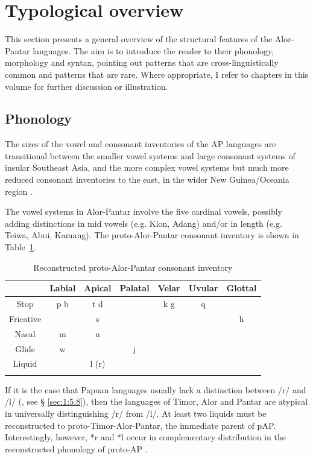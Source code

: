 \section{Typological overview}\label{sec:1:5}

This section presents a general overview of the structural features of the Alor-Pantar languages. The aim is to introduce the reader to their phonology, morphology and syntax, pointing out patterns that are cross-linguistically common and patterns that are rare. Where appropriate, I refer to chapters in this volume for further discussion or illustration. 

\subsection{Phonology}\label{sec:1:5.1}
The sizes of the vowel and consonant inventories of the AP languages are transitional between the smaller vowel systems and large consonant systems of insular Southeast Asia, and the more complex vowel systems but much more reduced consonant inventories to the east, in the wider New Guinea/Oceania region \citep[cf.][]{Hajek2010}.

The vowel systems in Alor-Pantar involve the five cardinal vowels, possibly adding distinctions in mid vowels (e.g. Klon, Adang) and/or in length (e.g. Teiwa, Abui, Kamang). The proto-Alor-Pantar consonant inventory \citep{HoltonEtAl2012,HoltonRobinsonTVhistory} is shown in Table~\ref{tab:1:3}.



\begin{table} 
\begin{tabularx}{\textwidth}{ccccccc} 
\lsptoprule
& {Labial} & {Apical} & {Palatal} & {Velar} & {Uvular} & {Glottal}\\
\midrule 
{Stop} & {p  b} & {t  d} &  & {k  g} & {q} & \\
{Fricative} &  & {s} &  &  &  & {h}\\
{Nasal} & {m} & {n} &  &  &  & \\
{Glide} & {w} &  & {j} &  &  & \\
{Liquid} &  & {l (r)} &  &  &  & \\
\lspbottomrule
\end{tabularx}
\caption{Reconstructed proto-Alor-Pantar consonant inventory}
\label{tab:1:3}
\end{table}

If it is the case that Papuan languages usually lack a distinction between /r/ and /l/ (\citealt{Foley1986}, see {\S} \ref{sec:1:5.8}), then the languages of Timor, Alor and Pantar are atypical in universally distinguishing /r/ from /l/. At least two liquids must be reconstructed to proto-Timor-Alor-Pantar, the immediate parent of pAP. Interestingly, however, *r and *l occur in complementary distribution in the reconstructed phonology of proto-AP \citep{HoltonEtAl2012}. 

